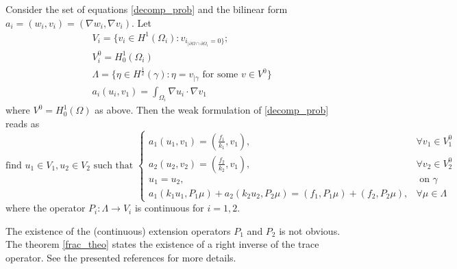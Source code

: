 \begin{proposition}
    Consider the set of equations \eqref{decomp_prob} and the bilinear form \(a_i = (w_i, v_i) = (\nabla w_i, \nabla v_i)\). Let
    \begin{align*}
        &V_i = \{v_i \in H^1(\Omega_i): v_{i_{|\partial \Omega \cap \partial {\Omega_i}}=0\}};\\
        &V_i^0 = H^1_0(\Omega_i)\\
        &\Lambda = \{\eta \in H^\frac{1}{2}(\gamma): \eta = v_{|\gamma} \text{ for some } v \in V^0\} \\
        &a_i (u_i, v_1) = \int_{\Omega_i} \nabla u_i \cdot \nabla v_1
    \end{align*}
    where \(V^0 = H^1_0(\Omega)\) as above.
    Then the weak formulation of \eqref{decomp_prob} reads as
    \begin{equation}\label{weak_decomp}
        \text{find } u_1\in V_1, u_2 \in V_2 \text{ such that }
        \begin{cases}
            a_1(u_1, v_1) = (\frac{f_1}{k_1}, v_1), & \forall v_1 \in V_1^0\\
            a_2(u_2, v_2) = (\frac{f_2}{k_2}, v_1), & \forall v_2 \in V_2^0\\
            u_1 = u_2, & \text{ on } \gamma\\
            a_1(k_1 u_1, P_1 \mu) + a_2(k_2 u_2, P_2 \mu) = (f_1, P_1 \mu) + (f_2, P_2 \mu), & \forall \mu \in \Lambda
        \end{cases}
    \end{equation}
    where the operator \(P_i: \Lambda \rightarrow V_i\) is continuous for \(i=1, 2\).
\end{proposition}

\begin{remark}
    The existence of the (continuous) extension operators \(P_1\) and \(P_2\) is not obvious. The theorem \ref{frac_theo} states the existence of a right inverse of the trace operator. See the presented references for more details. 
\end{remark}

